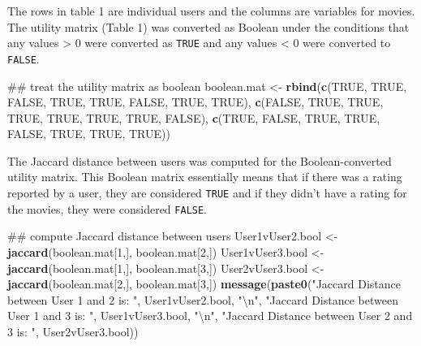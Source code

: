 \documentclass[]{article}
\newenvironment{Shaded}{\begin{snugshade}}{\end{snugshade}}
\newcommand{\KeywordTok}[1]{\textcolor[rgb]{0.13,0.29,0.53}{\textbf{{#1}}}}
\newcommand{\DecValTok}[1]{\textcolor[rgb]{0.00,0.00,0.81}{{#1}}}
\newcommand{\CharTok}[1]{\textcolor[rgb]{0.31,0.60,0.02}{{#1}}}
\newcommand{\StringTok}[1]{\textcolor[rgb]{0.31,0.60,0.02}{{#1}}}
\newcommand{\OtherTok}[1]{\textcolor[rgb]{0.56,0.35,0.01}{{#1}}}
\newcommand{\NormalTok}[1]{{#1}}
\begin{document}
The rows in table 1 are individual users and the columns are variables
for movies. The utility matrix (Table 1) was converted as Boolean under
the conditions that any values \textgreater{} 0 were converted as
\texttt{TRUE} and any values \textless{} 0 were converted to
\texttt{FALSE}.

\begin{Shaded}
\begin{Highlighting}[]
\NormalTok{## treat the utility matrix as boolean}
\NormalTok{boolean.mat <-}\StringTok{ }\KeywordTok{rbind}\NormalTok{(}\KeywordTok{c}\NormalTok{(}\OtherTok{TRUE}\NormalTok{, }\OtherTok{TRUE}\NormalTok{, }\OtherTok{FALSE}\NormalTok{, }\OtherTok{TRUE}\NormalTok{, }\OtherTok{TRUE}\NormalTok{, }\OtherTok{FALSE}\NormalTok{, }\OtherTok{TRUE}\NormalTok{, }\OtherTok{TRUE}\NormalTok{),}
                  \KeywordTok{c}\NormalTok{(}\OtherTok{FALSE}\NormalTok{, }\OtherTok{TRUE}\NormalTok{, }\OtherTok{TRUE}\NormalTok{, }\OtherTok{TRUE}\NormalTok{, }\OtherTok{TRUE}\NormalTok{, }\OtherTok{TRUE}\NormalTok{, }\OtherTok{TRUE}\NormalTok{, }\OtherTok{FALSE}\NormalTok{),}
                  \KeywordTok{c}\NormalTok{(}\OtherTok{TRUE}\NormalTok{, }\OtherTok{FALSE}\NormalTok{, }\OtherTok{TRUE}\NormalTok{, }\OtherTok{TRUE}\NormalTok{, }\OtherTok{FALSE}\NormalTok{, }\OtherTok{TRUE}\NormalTok{, }\OtherTok{TRUE}\NormalTok{, }\OtherTok{TRUE}\NormalTok{))}
\end{Highlighting}
\end{Shaded}

The Jaccard distance between users was computed for the
Boolean-converted utility matrix. This Boolean matrix essentially means
that if there was a rating reported by a user, they are considered
\texttt{TRUE} and if they didn't have a rating for the movies, they were
considered \texttt{FALSE}.

\begin{Shaded}
\begin{Highlighting}[]
\NormalTok{## compute Jaccard distance between users}
\NormalTok{User1vUser2.bool <-}\StringTok{ }\KeywordTok{jaccard}\NormalTok{(boolean.mat[}\DecValTok{1}\NormalTok{,], boolean.mat[}\DecValTok{2}\NormalTok{,])}
\NormalTok{User1vUser3.bool <-}\StringTok{ }\KeywordTok{jaccard}\NormalTok{(boolean.mat[}\DecValTok{1}\NormalTok{,], boolean.mat[}\DecValTok{3}\NormalTok{,])}
\NormalTok{User2vUser3.bool <-}\StringTok{ }\KeywordTok{jaccard}\NormalTok{(boolean.mat[}\DecValTok{2}\NormalTok{,], boolean.mat[}\DecValTok{3}\NormalTok{,])}
\KeywordTok{message}\NormalTok{(}\KeywordTok{paste0}\NormalTok{(}\StringTok{"Jaccard Distance between User 1 and 2 is: "}\NormalTok{, User1vUser2.bool, }\StringTok{"}\CharTok{\textbackslash{}n}\StringTok{"}\NormalTok{,}
               \StringTok{"Jaccard Distance between User 1 and 3 is: "}\NormalTok{, User1vUser3.bool, }\StringTok{"}\CharTok{\textbackslash{}n}\StringTok{"}\NormalTok{,}
               \StringTok{"Jaccard Distance between User 2 and 3 is: "}\NormalTok{, User2vUser3.bool))}
\end{Highlighting}
\end{Shaded}
\end{document}
